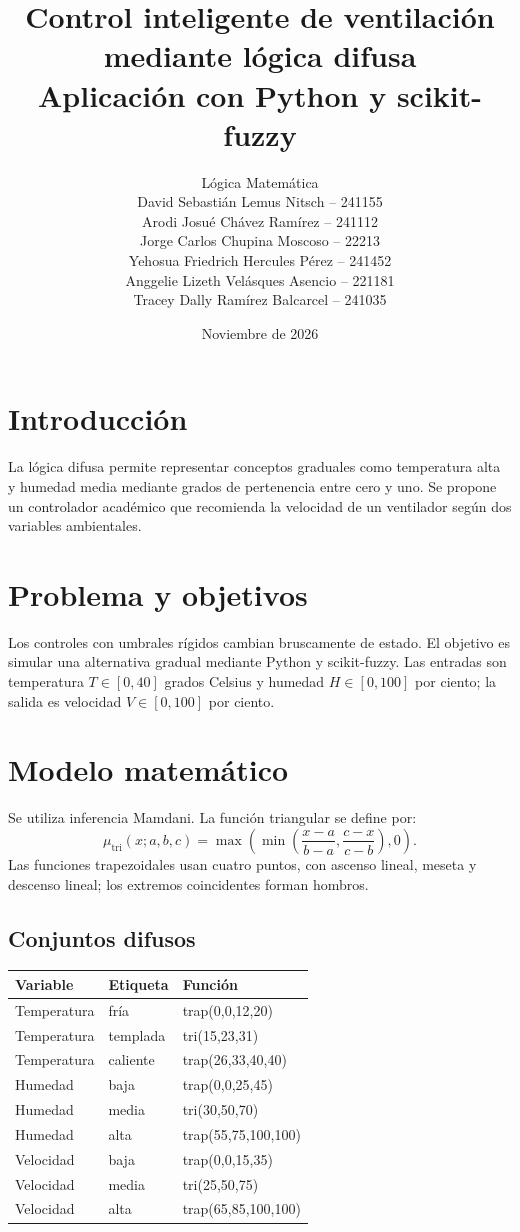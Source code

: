\documentclass[11pt,letterpaper]{article}
\title{Control inteligente de ventilación mediante lógica difusa\\\large Aplicación con Python y scikit-fuzzy}
\author{Lógica Matemática\\
David Sebastián Lemus Nitsch -- 241155\\
Arodi Josué Chávez Ramírez -- 241112\\
Jorge Carlos Chupina Moscoso -- 22213\\
Yehosua Friedrich Hercules Pérez -- 241452\\
Anggelie Lizeth Velásques Asencio -- 221181\\
Tracey Dally Ramírez Balcarcel -- 241035}
\date{Noviembre de 2026}
\begin{document}
\maketitle
\section{Introducción}
La lógica difusa permite representar conceptos graduales como temperatura alta y humedad media mediante grados de pertenencia entre cero y uno. Se propone un controlador académico que recomienda la velocidad de un ventilador según dos variables ambientales.
\section{Problema y objetivos}
Los controles con umbrales rígidos cambian bruscamente de estado. El objetivo es simular una alternativa gradual mediante Python y scikit-fuzzy. Las entradas son temperatura $T\in[0,40]$ grados Celsius y humedad $H\in[0,100]$ por ciento; la salida es velocidad $V\in[0,100]$ por ciento.
\section{Modelo matemático}
Se utiliza inferencia Mamdani. La función triangular se define por:
\[\mu_{\mathrm{tri}}(x;a,b,c)=\max\left(\min\left(\frac{x-a}{b-a},\frac{c-x}{c-b}\right),0\right).\]
Las funciones trapezoidales usan cuatro puntos, con ascenso lineal, meseta y descenso lineal; los extremos coincidentes forman hombros.
\subsection{Conjuntos difusos}
\begin{center}\begin{tabular}{lll}\toprule Variable & Etiqueta & Función\\\midrule
Temperatura & fría & trap(0,0,12,20)\\
Temperatura & templada & tri(15,23,31)\\
Temperatura & caliente & trap(26,33,40,40)\\
Humedad & baja & trap(0,0,25,45)\\
Humedad & media & tri(30,50,70)\\
Humedad & alta & trap(55,75,100,100)\\
Velocidad & baja & trap(0,0,15,35)\\
Velocidad & media & tri(25,50,75)\\
Velocidad & alta & trap(65,85,100,100)\\\bottomrule\end{tabular}\end{center}
\end{document}
